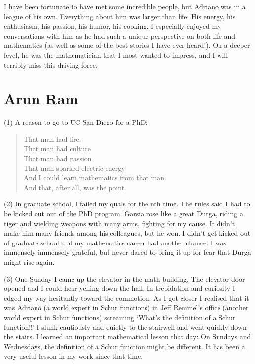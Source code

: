 \documentclass{notices}
\begin{document}
I have been fortunate to have met some incredible people, but Adriano was in a league of his own. Everything about him was larger than life. His energy, his enthusiasm, his passion, his humor, his cooking. I especially enjoyed my conversations with him as he had such a unique perspective  on both life and  mathematics (as well as some of the best stories I have ever heard!). On a deeper level, he was the mathematician that I most wanted to impress, and I will terribly miss this driving force.

\section*{Arun Ram}
(1)  A reason to go to UC San Diego for a PhD:
\begin{quote}
That man had fire,\\
That man had culture\\
That man had passion\\
That man sparked electric energy\\
And I could learn mathematics from that man.\\
And that, after all, was the point.
\end{quote}

(2) In graduate school, I failed my quals for the nth time.  
The rules said I had to be kicked out out of the PhD program.
Garsia rose like a great Durga,
riding a tiger and wielding weapons with many arms,
fighting for my cause.  
It didn't make him many friends among his colleagues, but he won.
I didn't get kicked out of graduate school and
my mathematics career had another chance.
I was immensely immensely grateful,
but never dared to bring it up
for fear that Durga might rise again.

(3) One Sunday I came up the elevator in the math building.
The elevator door opened and  I could hear yelling down the hall.  
In trepidation and curiosity I edged my way hesitantly toward the commotion.  
As I got closer I realised that it was Adriano (a world expert in Schur functions)
in Jeff Remmel's office (another world expert in Schur functions)
screaming `What's the definition of a Schur function!!'
I slunk cautiously and quietly to the stairwell and went quickly down the stairs.
I learned an important mathematical lesson that day:
On Sundays and Wednesdays,
the definition of a Schur function might be different.
It has been a very useful lesson in my work since that time.
\end{document}
